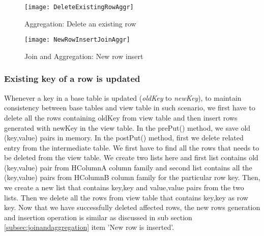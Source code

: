 \documentclass[11pt,a4paper,bibtotoc,idxtotoc,headsepline,footsepline,footexclude,BCOR12mm,DIV13]{scrbook}
\begin{document}
\begin{figure}
    \centering
    \texttt{[image: DeleteExistingRowAggr]}
    \caption{Aggregation: Delete an existing row}
    \label{sec:deleteexistingrow}
    
\end{figure} 


\begin{figure}
    \centering
    \texttt{[image: NewRowInsertJoinAggr]}
    \caption{Join and Aggregation: New row insert}
    \label{sec:insertnewrowjoinandaggr}
    
\end{figure}




\subsubsection{Existing key of a row is updated}

Whenever a key in a base table is updated (\emph{oldKey} to \emph{newKey}), to maintain consistency between base tables and view table in such scenario, we first have to delete all the rows containing oldKey from view table and then insert rows generated with newKey in the view table. In the prePut()
 method, we save old (key,value) pairs in memory. In the postPut() method, first we delete related entry from the intermediate table. We first have to find all the rows that needs to be deleted from the view table. We create two lists here and first list contains old (key,value) pair from HColumnA column family and second list contains all the (key,value) pairs from HColumnB column family for the particular row key. Then, we create a new list that contains key,key and value,value pairs from the two lists. Then we delete all the rows from view table that contains key,key as row key. Now that we have successfully deleted affected rows, the new rows generation and insertion operation is similar as discussed in sub section \ref{subsec:joinandaggregation} item 'New row is inserted'.
 
\end{document}
